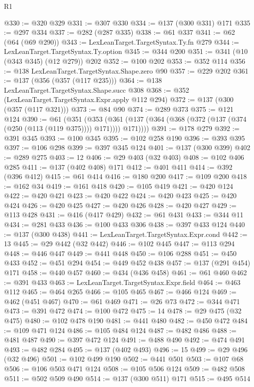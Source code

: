 \begin{lexlean}{R1}
\begin{coremodule}
{{{{{{{{{{{{{{{{{{{{{{{{{{{{{{{{{{{{{{{{{{{{{{{{{{{{{{{{{{{{{{{{{{{{{{{{{{{{{{{{{{{{{{{{{{@330 := @320 @329
@331 := @307 @330
@334 := @137 (@300 @331) @171
@335 := @297 @334
@337 := @282 (@287 @335)
@338 := @61 @337
@341 := @62 (@64 (@69 @290))
@343 := LexLeanTarget.TargetSyntax.Ty.fn @279
@344 := LexLeanTarget.TargetSyntax.Ty.option
@345 := @344 @200
@351 := @341 (@10 (@343 @345) (@12 @279)) @202
@352 := @100 @202
@353 := @352 @114
@356 := @138 LexLeanTarget.TargetSyntax.Shape.zero @90
@357 := @229 @202
@361 := @137 (@356 (@357 (@117 @235)))
@364 := @138 LexLeanTarget.TargetSyntax.Shape.succ @308
@368 := @352 (LexLeanTarget.TargetSyntax.Expr.apply @112 @294)
@372 := @137 (@300 (@357 (@117 @321)))
@373 := @84 @90
@374 := @289 @373
@375 := @121 @124
@390 := @61
    (@351
      (@353 (@361 (@137 (@364 (@368 (@372 (@137 (@374 (@250 (@113 (@119 @375)))) @171)))) @171))))
@391 := @178 @279
@392 := @391 @345
@393 := @100 @345
@395 := @102 @258 @190
@396 := @393 @395
@397 := @106 @298
@399 := @397 @345 @124
@401 := @137 (@300 @399)
@402 := @289 @275
@403 := 12
@406 := @29 @403 (@32 @403)
@408 := @102 @406 @285
@411 := @137 (@402 @408) @171
@412 := @401 @411
@414 := @392 (@396 @412)
@415 := @61 @414
@416 := @180 @200
@417 := @109 @200
@418 := @162 @34
@419 := @161 @418
@420 := @105 @419
@421 := @420 @124
@422 := @420 @421
@423 := @420 @422
@424 := @420 @423
@425 := @420 @424
@426 := @420 @425
@427 := @420 @426
@428 := @420 @427
@429 := @113 @428
@431 := @416 (@417 @429)
@432 := @61 @431
@433 := @344 @11
@434 := @281 @433
@436 := @100 @433 @306
@438 := @397 @433 @124
@440 := @137 (@300 @438)
@441 := LexLeanTarget.TargetSyntax.Expr.cond
@442 := 13
@445 := @29 @442 (@32 @442)
@446 := @102 @445
@447 := @113 @294
@448 := @446 @447
@449 := @441 @448
@450 := @106 @288
@451 := @450 @433
@452 := @451 @294
@454 := @449 @452 @438
@457 := @137 (@291 @454) @171
@458 := @440 @457
@460 := @434 (@436 @458)
@461 := @61 @460
@462 := @391 @433
@463 := LexLeanTarget.TargetSyntax.Expr.field
@464 := @463 @112
@465 := @464 @265
@466 := @105 @465
@467 := @466 @124
@469 := @462 (@451 @467)
@470 := @61 @469
@471 := @26 @73
@472 := @344 @471
@473 := @391 @472
@474 := @100 @472
@475 := 14
@478 := @29 @475 (@32 @475)
@480 := @102 @478 @190
@481 := @441 @480
@482 := @450 @472
@484 := @109 @471 @124
@486 := @105 @484 @124
@487 := @482 @486
@488 := @481 @487
@490 := @397 @472 @124
@491 := @488 @490
@492 := @474 @491
@493 := @482 @284
@495 := @137 (@402 @493)
@496 := 15
@499 := @29 @496 (@32 @496)
@501 := @102 @499 @190
@502 := @441 @501
@503 := @107 @68
@506 := @106 @503 @471 @124
@508 := @105 @506 @124
@509 := @482 @508
@511 := @502 @509 @490
@514 := @137 (@300 @511) @171
@515 := @495 @514
}}}}}}}}}}}}}}}}}}}}}}}}}}}}}}}}}}}}}}}}}}}}}}}}}}}}}}}}}}}}}}}}}}}}}}}}}}}}}}}}}}}}}}}}}}
\end{coremodule}
\end{lexlean}
